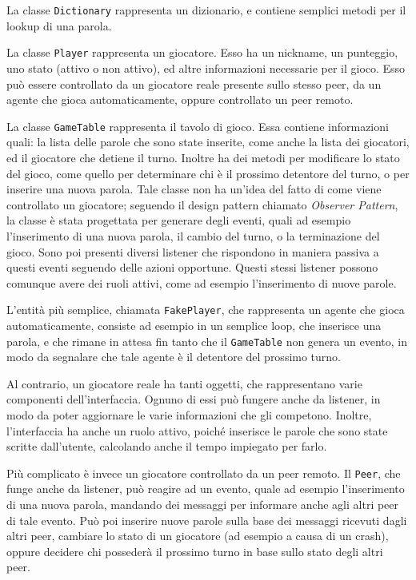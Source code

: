 \documentclass[10.5pt]{article}
\begin{document}
La classe \texttt{Dictionary} rappresenta un dizionario, e contiene semplici metodi per il lookup di una parola.

La classe \texttt{Player} rappresenta un giocatore. Esso ha un nickname, un punteggio, uno stato (attivo o non attivo), ed altre informazioni necessarie per il gioco. Esso può essere controllato da un giocatore reale presente sullo stesso peer, da un agente che gioca automaticamente, oppure controllato un peer remoto.

La classe \texttt{GameTable} rappresenta il tavolo di gioco. Essa contiene informazioni quali: la lista delle parole che sono state inserite, come anche la lista dei giocatori, ed il giocatore che detiene il turno. Inoltre ha dei metodi per modificare lo stato del gioco, come quello per determinare chi è il prossimo detentore del turno, o per inserire una nuova parola. Tale classe non ha un'idea del fatto di come viene controllato un giocatore; seguendo il design pattern chiamato \textit{Observer Pattern}, la classe è stata progettata per generare degli eventi, quali ad esempio l'inserimento di una nuova parola, il cambio del turno, o la terminazione del gioco. Sono poi presenti diversi listener che rispondono in maniera passiva a questi eventi seguendo delle azioni opportune. Questi stessi listener possono comunque avere dei ruoli attivi, come ad esempio l'inserimento di nuove parole. 

L'entità più semplice, chiamata \texttt{FakePlayer}, che rappresenta un agente che gioca automaticamente, consiste ad esempio in un semplice loop, che inserisce una parola, e che rimane in attesa fin tanto che il \texttt{GameTable} non genera un evento, in modo da segnalare che tale agente è il detentore del prossimo turno. 

Al contrario, un giocatore reale ha tanti oggetti, che rappresentano varie componenti dell'interfaccia. Ognuno di essi può fungere anche da listener, in modo da poter aggiornare le varie informazioni che gli competono. Inoltre, l'interfaccia ha anche un ruolo attivo, poiché inserisce le parole che sono state scritte dall'utente, calcolando anche il tempo impiegato per farlo.

Più complicato è invece un giocatore controllato da un peer remoto. Il \texttt{Peer}, che funge anche da listener, può reagire ad un evento, quale ad esempio l'inserimento di una nuova parola, mandando dei messaggi per informare anche agli altri peer di tale evento. Può poi inserire nuove parole sulla base dei messaggi ricevuti dagli altri peer, cambiare lo stato di un giocatore (ad esempio a causa di un crash), oppure decidere chi possederà il prossimo turno in base sullo stato degli altri peer.
\end{document}
